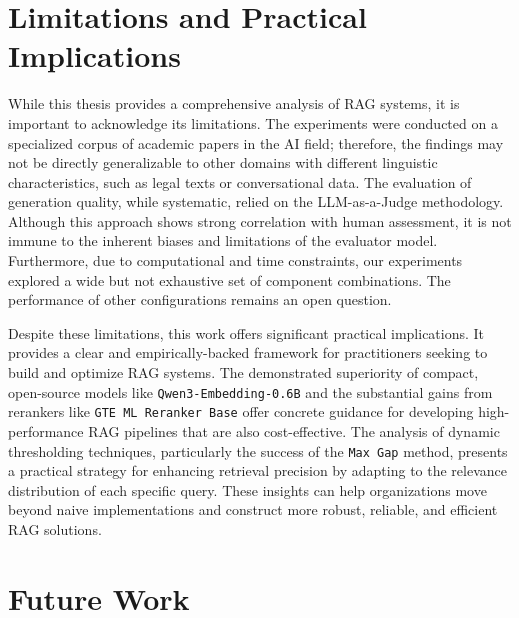 \section{Limitations and Practical Implications}

While this thesis provides a comprehensive analysis of RAG systems, it is important to acknowledge its limitations. The experiments were conducted on a specialized corpus of academic papers in the AI field; therefore, the findings may not be directly generalizable to other domains with different linguistic characteristics, such as legal texts or conversational data. The evaluation of generation quality, while systematic, relied on the LLM-as-a-Judge methodology. Although this approach shows strong correlation with human assessment, it is not immune to the inherent biases and limitations of the evaluator model. Furthermore, due to computational and time constraints, our experiments explored a wide but not exhaustive set of component combinations. The performance of other configurations remains an open question.

Despite these limitations, this work offers significant practical implications. It provides a clear and empirically-backed framework for practitioners seeking to build and optimize RAG systems. The demonstrated superiority of compact, open-source models like \texttt{Qwen3-Embedding-0.6B} and the substantial gains from rerankers like \texttt{GTE ML Reranker Base} offer concrete guidance for developing high-performance RAG pipelines that are also cost-effective. The analysis of dynamic thresholding techniques, particularly the success of the \texttt{Max Gap} method, presents a practical strategy for enhancing retrieval precision by adapting to the relevance distribution of each specific query. These insights can help organizations move beyond naive implementations and construct more robust, reliable, and efficient RAG solutions.

\section{Future Work}

